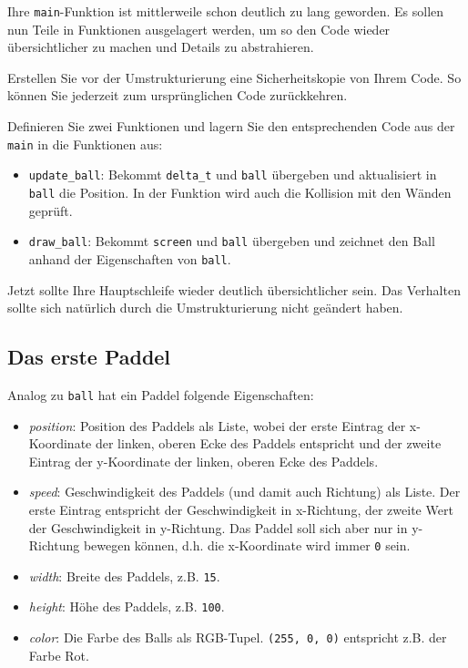 \documentclass[
]{scrartcl}
\providecommand{\tightlist}{%
  \setlength{\itemsep}{0pt}\setlength{\parskip}{0pt}}
\begin{document}
Ihre \texttt{main}-Funktion ist mittlerweile schon deutlich zu lang
geworden. Es sollen nun Teile in Funktionen ausgelagert werden, um so
den Code wieder übersichtlicher zu machen und Details zu abstrahieren.

 Erstellen Sie vor der Umstrukturierung eine
Sicherheitskopie von Ihrem Code. So können Sie jederzeit zum
ursprünglichen Code zurückkehren.

 Definieren Sie zwei Funktionen und lagern Sie den
entsprechenden Code aus der \texttt{main} in die Funktionen aus:

\begin{itemize}
\tightlist
\item
  \texttt{update\_ball}: Bekommt \texttt{delta\_t} und \texttt{ball}
  übergeben und aktualisiert in \texttt{ball} die Position. In der
  Funktion wird auch die Kollision mit den Wänden geprüft.
\item
  \texttt{draw\_ball}: Bekommt \texttt{screen} und \texttt{ball}
  übergeben und zeichnet den Ball anhand der Eigenschaften von
  \texttt{ball}.
\end{itemize}

Jetzt sollte Ihre Hauptschleife wieder deutlich übersichtlicher sein.
Das Verhalten sollte sich natürlich durch die Umstrukturierung nicht
geändert haben.

\hypertarget{das-erste-paddel}{%
\subsection{Das erste Paddel}\label{das-erste-paddel}}

Analog zu \texttt{ball} hat ein Paddel folgende Eigenschaften:

\begin{itemize}
\tightlist
\item
  \emph{position}: Position des Paddels als Liste, wobei der erste
  Eintrag der x-Koordinate der linken, oberen Ecke des Paddels
  entspricht und der zweite Eintrag der y-Koordinate der linken, oberen
  Ecke des Paddels.
\item
  \emph{speed}: Geschwindigkeit des Paddels (und damit auch Richtung)
  als Liste. Der erste Eintrag entspricht der Geschwindigkeit in
  x-Richtung, der zweite Wert der Geschwindigkeit in y-Richtung. Das
  Paddel soll sich aber nur in y-Richtung bewegen können, d.h. die
  x-Koordinate wird immer \texttt{0} sein.
\item
  \emph{width}: Breite des Paddels, z.B. \texttt{15}.
\item
  \emph{height}: Höhe des Paddels, z.B. \texttt{100}.
\item
  \emph{color}: Die Farbe des Balls als RGB-Tupel.
  \texttt{(255,\ 0,\ 0)} entspricht z.B. der Farbe Rot.
\end{itemize}
\end{document}
